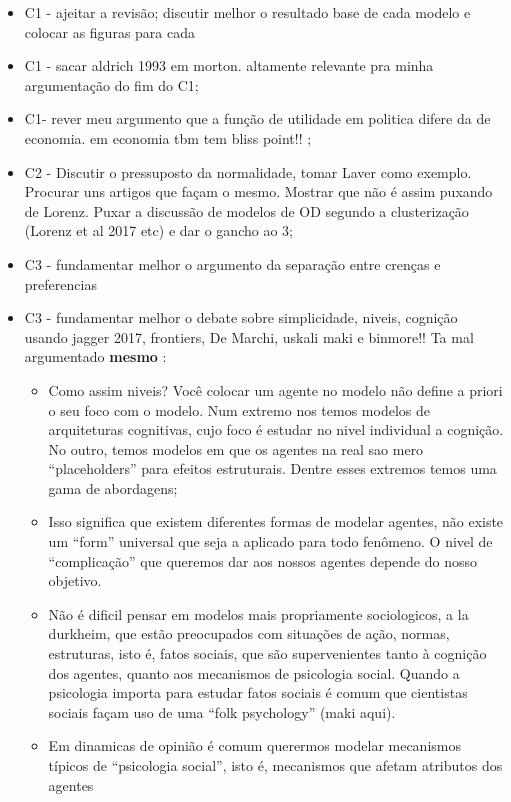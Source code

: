 \documentclass{article}
\begin{document}
\begin{itemize}
\item {\Large C1 - ajeitar a revisão; discutir melhor o resultado base de cada
    modelo e colocar as figuras para cada}
\item {\Large C1 - sacar aldrich 1993 em morton. altamente relevante pra minha
    argumentação do fim do C1};
\item {\Large  C1- rever meu argumento que a função de utilidade em politica
    difere da de economia. em economia tbm tem bliss point!! };
\item {\Large C2 - Discutir o pressuposto da normalidade, tomar Laver como
    exemplo. Procurar uns artigos que façam o mesmo. Mostrar que não é assim
    puxando de Lorenz. Puxar a discussão de modelos de OD segundo a
    clusterização (Lorenz et al 2017 etc) e dar o gancho ao 3};
\item {\Large C3 - fundamentar melhor o argumento da separação entre crenças e
    preferencias}
\item {\Large C3 - fundamentar melhor o debate sobre simplicidade, niveis,
    cognição usando jagger 2017, frontiers, De Marchi, uskali maki e binmore!!
    Ta mal argumentado \textbf{mesmo} }:
  \begin{itemize}
  \item Como assim niveis? Você colocar um agente no modelo não define a priori
    o seu foco com o modelo. Num extremo nos temos modelos de arquiteturas
    cognitivas, cujo foco é estudar no nivel individual a cognição. No outro,
    temos modelos em que os agentes na real sao mero ``placeholders'' para
    efeitos estruturais. Dentre esses extremos temos uma gama de abordagens;
  \item Isso significa que existem diferentes formas de modelar agentes, não
    existe um ``form'' universal que seja a aplicado para todo fenômeno. O nivel
    de ``complicação'' que queremos dar aos nossos agentes depende do nosso
    objetivo.
  \item Não é dificil pensar em modelos mais propriamente sociologicos, a la
    durkheim, que estão preocupados com situações de ação, normas, estruturas,
    isto é, fatos sociais, que são supervenientes tanto à cognição dos agentes,
    quanto aos mecanismos de psicologia social. Quando a psicologia importa para
    estudar fatos sociais é comum que cientistas sociais façam uso de uma ``folk
    psychology'' (maki aqui).
  \item Em dinamicas de opinião é comum querermos modelar mecanismos típicos de
    ``psicologia social'', isto é, mecanismos que afetam atributos dos agentes

\end{itemize}
\end{itemize}
\end{document}
